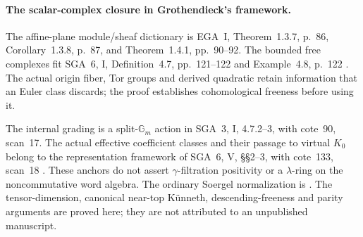 \paragraph{The scalar-complex closure in Grothendieck's framework.}
The affine-plane module/sheaf dictionary is EGA~I,
Theorem~1.3.7, p.~86, Corollary~1.3.8, p.~87,
and Theorem~1.4.1, pp.~90--92.
The bounded free complexes fit SGA~6, I,
Definition~4.7, pp.~121--122 and Example~4.8, p.~122
\cite{EGA,SGA6}. The actual origin fiber, Tor groups
and derived quadratic retain information that an
Euler class discards; the proof establishes cohomological
freeness before using it.

The internal grading is a split-\(\mathbb G_m\) action
in SGA~3, I, 4.7.2--3, with cote~90, scan~17.
The actual effective coefficient classes and their
passage to virtual \(K_0\) belong to the representation
framework of SGA~6, V, \S\S2--3, with cote~133, scan~18
\cite{SGA3,SGA6,Archive}. These anchors do not assert
\(\gamma\)-filtration positivity or a \(\lambda\)-ring
on the noncommutative word algebra.
The ordinary Soergel normalization is
\cite[\S3.3, p.~1105; \S3.4, pp.~1106--1107;
\S3.5, Theorem~3.5]{EW}.
The tensor-dimension, canonical near-top K\"unneth,
descending-freeness and parity arguments are proved
here; they are not attributed to an unpublished manuscript.
